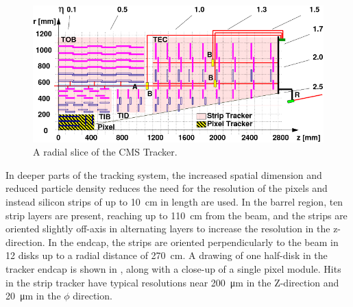 \begin{figure}[htbp]
    \includegraphics[width=1.1\textwidth]{figures/cms_tracker.png}
    \centering
    \caption{A radial slice of the CMS Tracker.}
    \label{fig:cmsTracker}
\end{figure}

In deeper parts of the tracking system, the increased spatial dimension and reduced particle density reduces the need for the resolution of the pixels and instead silicon strips of up to \SI{10}{\centi\meter} in length are used. 
In the barrel region, ten strip layers are present, reaching up to \SI{110}{\centi\meter} from the beam, and the strips are oriented slightly off-axis in alternating layers to increase the resolution in the z-direction. 
In the endcap, the strips are oriented perpendicularly to the beam in 12 disks up to a radial distance of \SI{270}{\centi\meter}.
A drawing of one half-disk in the tracker endcap is shown in , along with a close-up of a single pixel module.
Hits in the strip tracker have typical resolutions near \SI{200}{\micro\meter} in the Z-direction and \SI{20}{\micro\meter} in the $\phi$ direction.


